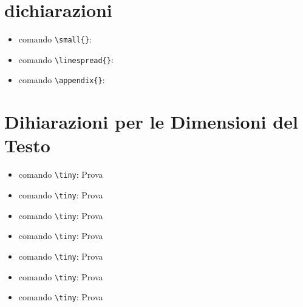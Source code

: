 \documentclass{report}
\begin{document}
        \section{dichiarazioni}
            \begin{itemize}
                \item comando \verb!\small{}!:        %
                \item comando \verb!\linespread{}!:   %
                \item comando \verb!\appendix{}!:     %
            \end{itemize}

        \section{Dihiarazioni per le Dimensioni del Testo}
            \begin{itemize}
                \item comando \verb!\tiny!: {\tiny Prova}
                \item comando \verb!\tiny!: {\footnotesize Prova}
                \item comando \verb!\tiny!: {\normalsize Prova}
                \item comando \verb!\tiny!: {\large Prova}
                \item comando \verb!\tiny!: {\Large Prova}
                \item comando \verb!\tiny!: {\LARGE Prova}
                \item comando \verb!\tiny!: {\huge Prova}
            \end{itemize}
\end{document}
